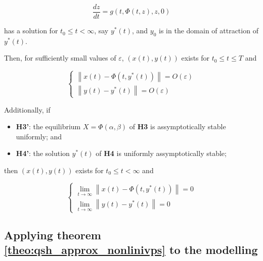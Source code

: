 \begin{theorem}
\begin{itemize}
\begin{equation} \dfrac{dz}{dt} = g\left(t,\Phi\left(t,z\right),z,0\right) \label{eq:theo_qsh_approx_nonlinivps_limz}\end{equation}

	has a solution for $t_0\leq t < \infty$, say $y^*(t)$, and $y_0$ is in the domain of attraction of $y^*(t)$.
\end{itemize}

	Then, for sufficiently small values of $\varepsilon$, $\left(x(t),y(t)\right)$ exists for $t_0 \leq t \leq T$ and

\begin{equation}\left\{\begin{array}{l} \left\lVert x(t) - \Phi\left(t,y^*\left(t\right)\right)\right\rVert = O\left(\varepsilon\right) \\[2mm] \left\lVert y(t) - y^*(t) \right\rVert = O\left(\varepsilon\right) \end{array}\right. \label{eq:qsh_approx_theo_result}\end{equation}

	Additionally, if

\begin{itemize}
	\item\textbf{H3'}: the equilibrium $X = \Phi\left(\alpha,\beta\right)$ of \textbf{H3} is assymptotically stable uniformly; and 

	\item\textbf{H4'}: the solution $y^*(t)$ of \textbf{H4} is uniformly assymptotically stable;
\end{itemize}

	then $\left(x(t),y(t)\right)$ exists for $t_0 \leq t < \infty$ and

\begin{equation}\left\{\begin{array}{l} \lim\limits_{t\to\infty} \left\lVert x(t) - \Phi\left(t,y^*\left(t\right)\right)\right\rVert = 0 \\[2mm] \lim\limits_{t\to\infty} \left\lVert y(t) - y^*(t) \right\rVert = 0 \end{array}\right. \label{eq:qsh_approx_theo_assympt}\end{equation}
\end{theorem} %

\subsection{Applying theorem \ref{theo:qsh_approx_nonlinivps} to the modelling } %

